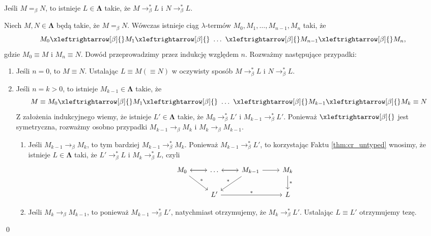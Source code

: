 \begin{wniosek}\label{thm:ch_wniosek1_untyped}
  Jeśli \(M=_\beta N\), to istnieje \(L\in\mathbf{\Lambda}\) takie, że \(M\to^{*}_\beta L\) i \(N\to^{*}_\beta L\).
\end{wniosek}
\begin{dowod}
  Niech \(M, N\in\mathbf{\Lambda}\) będą takie, że \(M=_\beta N\). Wówczas istnieje ciąg \(\lambda\)-termów \(M_0, M_1, \dots, M_{n-1}, M_n\) taki, że
  \[
    M_0\xleftrightarrow[\beta]{}M_1\xleftrightarrow[\beta]{}\ \dots\ \xleftrightarrow[\beta]{}M_{n-1}\xleftrightarrow[\beta]{}M_n,
  \]
  gdzie \(M_0\equiv M\) i \(M_n \equiv N\). Dowód przeprowadzimy przez indukcję względem \(n\). Rozważmy następujące przypadki:
  \begin{enumerate}[label={(\arabic*)}, ref={(\arabic*)}]
    \setlength\itemsep{0em}
    \item Jeśli \(n=0\), to \(M\equiv N\). Ustalając \(L\equiv M (\equiv N)\) w oczywisty sposób \(M\to^{*}_\beta L\) i \(N\to^{*}_\beta L\).
    \item Jeśli \(n=k>0\), to istnieje \(M_{k-1}\in\mathbf{\Lambda}\) takie, że 
   \[
    M\equiv M_0\xleftrightarrow[\beta]{}M_1\xleftrightarrow[\beta]{}\ \dots\ \xleftrightarrow[\beta]{}M_{k-1}\xleftrightarrow[\beta]{}M_k\equiv N
  \]
      Z założenia indukcyjnego wiemy, że istnieje \(L'\in\mathbf{\Lambda}\) takie, że \(M_0 \to^{*}_\beta L'\) i \(M_{k-1} \to^{*}_\beta L'\). Ponieważ \(\xleftrightarrow[\beta]{}\) jest symetryczna, rozważmy osobno przypadki \(M_{k-1}\to_\beta M_k\) i \(M_{k}\to_\beta M_{k-1}\).
  \begin{enumerate}[label={(\alph*)}, ref={(\alph*)}]
    \setlength\itemsep{0em}
    \item Jeśli \(M_{k-1}\to_\beta M_k\), to tym bardziej \(M_{k-1}\to^{*}_\beta M_k\). Ponieważ \(M_{k-1}\to^{*}_\beta L'\), to korzystając Faktu \ref{thm:cr_untyped} wnosimy, że istnieje \(L\in\mathbf{\Lambda}\) taki, że \(L'\to^{*}_\beta L\) i \(M_k \to^{*}_\beta L\), czyli
               \[ \begin{tikzcd}
                 M_0 \arrow{r} \arrow{dr}{*} & \dots \arrow{l} \arrow{r} &  M_{k-1} \arrow{l}{} \arrow{r}{} \arrow[swap]{dl}{*} & M_k \arrow{d}{*} \\%
                 & L' \arrow{rr}{*} & & L 
               \end{tikzcd}
               \] 
             \item Jeśli \(M_{k}\to_\beta M_{k-1}\), to ponieważ \(M_{k-1}\to^{*}_\beta L'\), natychmiast otrzymujemy, że \(M_k \to^{*}_\beta L'\). Ustalając \(L\equiv L'\) otrzymujemy tezę.
  \end{enumerate}
  \end{enumerate}
  \qed
\end{dowod}

